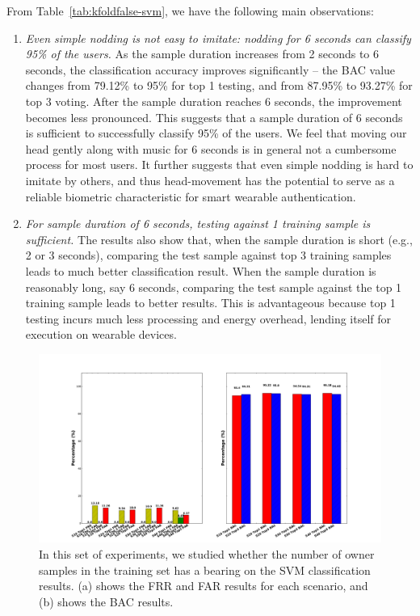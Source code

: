 From Table~\ref{tab:kfoldfalse-svm}, we have the following main observations:

\begin{enumerate}
\item \emph{Even simple nodding is not easy to imitate: nodding for 6 seconds can classify 95\% of the users.} As the sample duration increases from 2 seconds to 6 seconds, the classification accuracy improves significantly -- the BAC value changes from 79.12\% to 95\% for top 1 testing, and from 87.95\% to 93.27\% for top 3 voting. After the sample duration reaches 6 seconds, the improvement becomes less pronounced. This suggests that a sample duration of 6 seconds is sufficient to successfully classify 95\% of the users. We feel that moving our head gently along with music for 6 seconds is in general not a cumbersome process for most users. It further suggests that even simple nodding is hard to imitate by others, and thus head-movement has the potential to serve as a reliable biometric characteristic for smart wearable authentication.


\item \emph{For sample duration of 6 seconds, testing against 1 training sample is sufficient.} The results also show that, when the sample duration is short (e.g., 2 or 3 seconds), comparing the test sample against top 3 training samples leads to much better classification result. When the sample duration is reasonably long, say 6 seconds, comparing the test sample against the top 1 training sample leads to better results. This is advantageous because top 1 testing incurs much less processing and energy overhead, lending itself for execution on wearable devices.
\end{enumerate}


\begin{figure}[t]
\centering
\includegraphics [width=.95\linewidth]{fig/exp1_vary_size_svm}
\caption{In this set of experiments, we studied whether the number of owner samples in the training set has a bearing on the SVM classification results. (a) shows the FRR and FAR results for each scenario, and (b) shows the BAC results.\label{fig:exp1_vary_size_svm}}
\end{figure}

